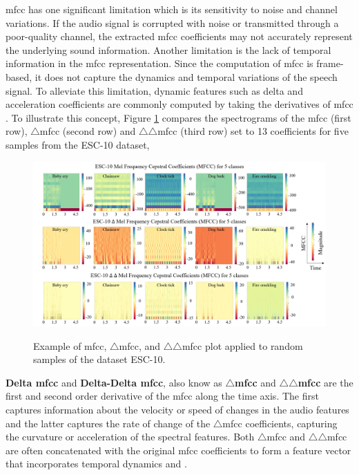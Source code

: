 \gls{mfcc} has one significant limitation which is its sensitivity to noise and channel variations. If the audio signal is corrupted with noise or transmitted through a poor-quality channel, the extracted \gls{mfcc} coefficients may not accurately represent the underlying sound information. Another limitation is the lack of temporal information in the \gls{mfcc} representation. Since the computation of \gls{mfcc} is frame-based, it does not capture the dynamics and temporal variations of the speech signal. To alleviate this limitation, dynamic features such as delta and acceleration coefficients are commonly computed by taking the derivatives of \gls{mfcc} \cite{Gold2011}. To illustrate this concept, Figure \ref{fig:frmwk_spectral_features_mfcc} compares the spectrograms of the \gls{mfcc} (first row), $\triangle$\gls{mfcc} (second row) and $\triangle\triangle$\gls{mfcc} (third row) set to 13 coefficients for five samples from the ESC-10 dataset, 

\begin{figure}[htbp]
    \raggedright
        \caption{Example of \gls{mfcc}, $\triangle$\gls{mfcc}, and $\triangle\triangle$\gls{mfcc} plot applied to random samples of the dataset ESC-10.}
        \includegraphics[width=1.0\textwidth]{resources/images/030-theoretical_framework/Framework_spectral_features_mfcc.png}
        \label{fig:frmwk_spectral_features_mfcc}
\end{figure}

\textbf{Delta \gls{mfcc}} and \textbf{Delta-Delta \gls{mfcc}}, also know as \textbf{$\triangle$\gls{mfcc}} and \textbf{$\triangle\triangle$\gls{mfcc}} are the first and second order derivative of the \gls{mfcc} along the time axis. The first captures information about the velocity or speed of changes in the audio features and the latter captures the rate of change of the $\triangle$\gls{mfcc} coefficients, capturing the curvature or acceleration of the spectral features. Both $\triangle$\gls{mfcc} and $\triangle\triangle$\gls{mfcc} are often concatenated with the original \gls{mfcc} coefficients to form a feature vector that incorporates temporal dynamics \cite{Bountourakis2019} and \cite{Tang2018}. 


